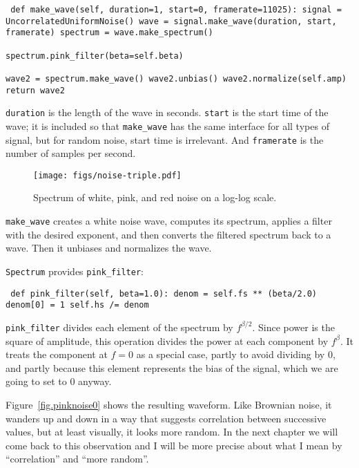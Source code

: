 \documentclass[12pt]{book} \usepackage[width=5.5in,height=8.5in, hmarginratio=3:2,vmarginratio=1:1]{geometry}
\begin{document}
\begin{verbatim} def make_wave(self, duration=1, start=0, framerate=11025): signal = UncorrelatedUniformNoise() wave = signal.make_wave(duration, start, framerate) spectrum = wave.make_spectrum() 

spectrum.pink_filter(beta=self.beta) 

wave2 = spectrum.make_wave() wave2.unbias() wave2.normalize(self.amp) return wave2 \end{verbatim} 

{\tt duration} is the length of the wave in seconds. {\tt start} is the start time of the wave; it is included so that \verb"make_wave" has the same interface for all types of signal, but for random noise, start time is irrelevant. And {\tt framerate} is the number of samples per second. 

\begin{figure} 

\centerline{\texttt{[image: figs/noise-triple.pdf]}} \caption{Spectrum of white, pink, and red noise on a log-log scale.} \label{fig.noise-triple} \end{figure} 

\verb"make_wave" creates a white noise wave, computes its spectrum, applies a filter with the desired exponent, and then converts the filtered spectrum back to a wave. Then it unbiases and normalizes the wave. 

{\tt Spectrum} provides \verb"pink_filter": 

\begin{verbatim} def pink_filter(self, beta=1.0): denom = self.fs ** (beta/2.0) denom[0] = 1 self.hs /= denom \end{verbatim} 

\verb"pink_filter" divides each element of the spectrum by $f^{\beta/2}$. Since power is the square of amplitude, this operation divides the power at each component by $f^\beta$. It treats the component at $f=0$ as a special case, partly to avoid dividing by 0, and partly because this element represents the bias of the signal, which we are going to set to 0 anyway. 

Figure~\ref{fig.pinknoise0} shows the resulting waveform. Like Brownian noise, it wanders up and down in a way that suggests correlation between successive values, but at least visually, it looks more random. In the next chapter we will come back to this observation and I will be more precise about what I mean by ``correlation'' and ``more random''. 
\end{document}
